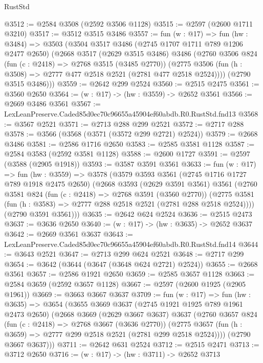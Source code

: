 \begin{lexlean}{RustStd}
\begin{coremodule}
@3512 := @2584 @3508 (@2592 @3506 @1128)
@3515 := @2597 (@2600 @1711 @3210)
@3517 := @3512 @3515 @3486
@3557 := fun (w : @17) =>
  fun (hw : @3484) =>
  @3503
    (@3504
      @3517
      @3486
      (@2745 @1707 @1711 @789 @1206 @2477 @2650)
      (@2668
        @3517
        (@2629 @3515 @3486)
        @3486
        (@2760
          @3506
          @824
          (fun (c : @2418) => @2768 @3515 (@3485 @2770))
          (@2775 @3506 (fun (h : @3508) => @2777 @477 @2518 @2521 (@2781 @477 @2518 @2524))))
        (@2790 @3515 @3486)))
@3559 := @2642 @299 @2524
@3560 := @2515 @2475
@3561 := @3560 @2650
@3564 := (w : @17) -> (hw : @3559) -> @2652 @3561
@3566 := @2669 @3486 @3561
@3567 := LexLeanPreserve.Caded85d0ec70c96655a45904ef60abdb.R0.RustStd.fnd13
@3568 := @3567 @2521
@3571 := @2713 @288 @299 @2521
@3572 := @2717 @288
@3578 := @3566 (@3568 (@3571 (@3572 @299 @2721) @2524))
@3579 := @2668 @3486
@3581 := @2586 @1716 @2650
@3583 := @2585 @3581 @1128
@3587 := @2584 @3583 (@2592 @3581 @1128)
@3588 := @2600 @1727
@3591 := @2597 (@3588 (@2905 @1918))
@3593 := @3587 @3591 @3561
@3633 := fun (w : @17) =>
  fun (hw : @3559) =>
  @3578
    (@3579
      @3593
      @3561
      (@2745 @1716 @1727 @789 @1918 @2475 @2650)
      (@2668
        @3593
        (@2629 @3591 @3561)
        @3561
        (@2760
          @3581
          @824
          (fun (c : @2418) => @2768 @3591 (@3560 @2770))
          (@2775 @3581 (fun (h : @3583) => @2777 @288 @2518 @2521 (@2781 @288 @2518 @2524))))
        (@2790 @3591 @3561)))
@3635 := @2642 @624 @2524
@3636 := @2515 @2473
@3637 := @3636 @2650
@3640 := (w : @17) -> (hw : @3635) -> @2652 @3637
@3642 := @2669 @3561 @3637
@3643 := LexLeanPreserve.Caded85d0ec70c96655a45904ef60abdb.R0.RustStd.fnd14
@3644 := @3643 @2521
@3647 := @2713 @299 @624 @2521
@3648 := @2717 @299
@3654 := @3642 (@3644 (@3647 (@3648 @624 @2721) @2524))
@3655 := @2668 @3561
@3657 := @2586 @1921 @2650
@3659 := @2585 @3657 @1128
@3663 := @2584 @3659 (@2592 @3657 @1128)
@3667 := @2597 (@2600 @1925 (@2905 @1961))
@3669 := @3663 @3667 @3637
@3709 := fun (w : @17) =>
  fun (hw : @3635) =>
  @3654
    (@3655
      @3669
      @3637
      (@2745 @1921 @1925 @789 @1961 @2473 @2650)
      (@2668
        @3669
        (@2629 @3667 @3637)
        @3637
        (@2760
          @3657
          @824
          (fun (c : @2418) => @2768 @3667 (@3636 @2770))
          (@2775 @3657 (fun (h : @3659) => @2777 @299 @2518 @2521 (@2781 @299 @2518 @2524))))
        (@2790 @3667 @3637)))
@3711 := @2642 @631 @2524
@3712 := @2515 @2471
@3713 := @3712 @2650
@3716 := (w : @17) -> (hw : @3711) -> @2652 @3713

\end{coremodule}
\end{lexlean}

